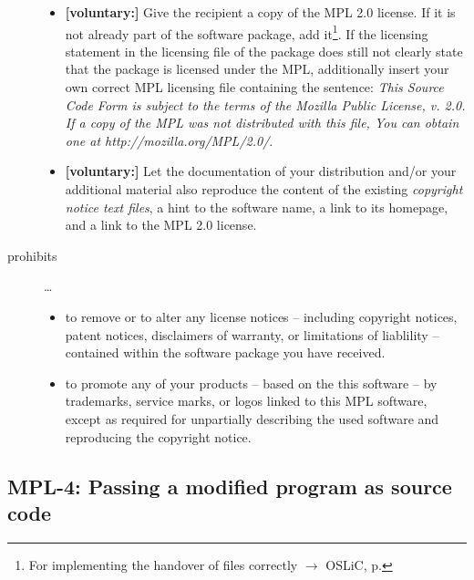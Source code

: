 \begin{description}
\begin{itemize}
  \item \textbf{[voluntary:]} Give the recipient a copy of the MPL 2.0 license.
  If it is not already part of the software package, add it\footnote{For
  implementing the handover of files correctly $\rightarrow$ OSLiC, p.
  \pageref{DistributingFilesHint}}. If the licensing statement in the licensing
  file of the package does still not clearly state that the package is licensed
  under the MPL, additionally insert your own correct MPL licensing file
  containing the sentence: \emph{This Source Code Form is subject to the terms
  of the Mozilla Public License, v. 2.0. If a copy of the MPL was not
  distributed with this file, You can obtain one at
  http://mozilla.org/MPL/2.0/}.
  
  \item \textbf{[voluntary:]} Let the documentation of your distribution and/or
  your additional material also reproduce the content of the existing
  \emph{copyright notice text files}, a hint to the software name, a link to its
  homepage, and a link to the MPL 2.0 license.
    
\end{itemize}

\item[prohibits] \ldots
\begin{itemize}
  \item to remove or to alter any license notices -- including copyright
  notices, patent notices, disclaimers of warranty, or limitations of liablility
  -- contained within the software package you have received.
  \item to promote any of your products -- based on the this software -- by
  trademarks, service marks, or logos linked to this MPL software, except as
  required for unpartially describing the used software and reproducing the
  copyright notice.
\end{itemize}

\end{description}

\subsection{MPL-4: Passing a modified program as source code}
\label{OSUC-04S-MPL} 

